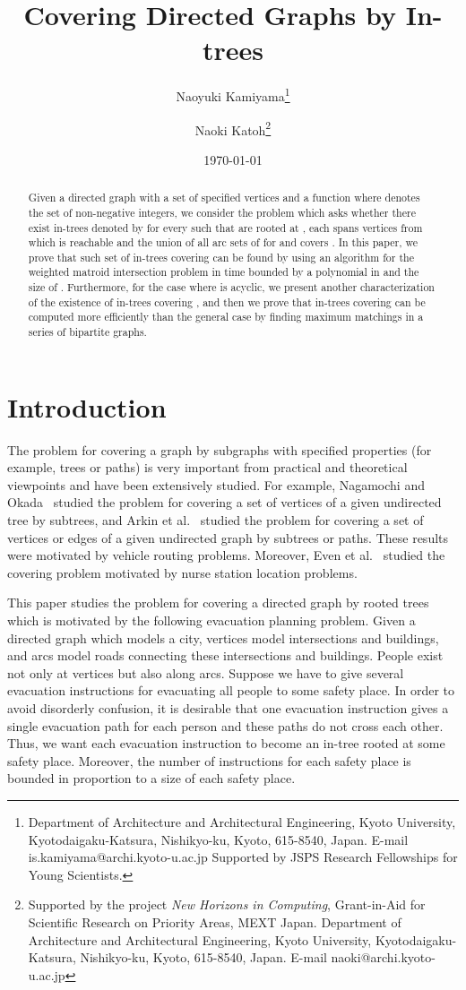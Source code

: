 \documentclass[11pt]{article}
\title{Covering Directed Graphs by In-trees}
\author{Naoyuki {\sc Kamiyama}\thanks{
Department of Architecture and Architectural Engineering,
Kyoto University, 
Kyotodaigaku-Katsura, Nishikyo-ku,
Kyoto, 615-8540, Japan.
E-mail {\ttfamily is.kamiyama@archi.kyoto-u.ac.jp} 
Supported by JSPS Research Fellowships for Young Scientists.}
\and 
Naoki {\sc Katoh}\thanks{Supported by the project {\it New Horizons in
Computing}, Grant-in-Aid for Scientific Research 
on Priority Areas, MEXT Japan.
Department of Architecture and Architectural Engineering,
Kyoto University, 
Kyotodaigaku-Katsura, Nishikyo-ku,
Kyoto, 615-8540, Japan.
E-mail {\ttfamily naoki@archi.kyoto-u.ac.jp} 
}
}
\date{\today}
\newcounter{ni}
\theoremstyle{plain}
\begin{document}
\maketitle

\begin{abstract}
\noindent
Given a directed graph  with a set of  specified vertices
 and a function  where  denotes the set of non-negative integers, 
we consider the problem which asks whether there exist  in-trees denoted by 
 for every  such that
 are rooted at , each 
spans vertices from which  is reachable and the union of all arc sets of
 for  and  covers . In this paper, we prove that such set of 
in-trees covering  can be found by using an algorithm for the weighted matroid intersection problem
in time bounded by a polynomial in  and the size of . 
Furthermore, for the case where  is acyclic, 
we present another characterization of the existence of in-trees covering ,  
and then we prove that in-trees covering  can be 
computed more efficiently than the general case by finding maximum matchings in a series of bipartite graphs.
\end{abstract}

\section{Introduction}


The problem for covering a graph by subgraphs with specified properties (for example, trees or paths) is
very important from practical and theoretical viewpoints and have
been extensively studied. For example, Nagamochi and Okada~\cite{NO07}
studied the problem for covering a set of vertices of a given undirected
tree by subtrees, and Arkin et al.~\cite{AHL06} studied the problem  
for covering a set of vertices or edges of a given undirected graph by
subtrees or paths. These results were motivated by vehicle routing problems. 
Moreover, Even et al.~\cite{EGKRS04} studied the covering problem
motivated by nurse station location problems. 

This paper studies the problem for covering a directed graph by rooted trees which is 
motivated by the following evacuation planning problem. 
Given a directed graph which models a city, 
vertices model intersections and buildings,
and arcs model roads connecting these intersections and buildings.
People exist not only at vertices but also along arcs. 
Suppose we have to give several evacuation instructions for
evacuating all people to some safety place. In order to avoid disorderly
confusion, it is desirable that one evacuation instruction gives a single evacuation path
for each person and these paths do not cross each other. 
Thus, we want each evacuation instruction to become an
in-tree rooted at some safety place. Moreover, the number of instructions
for each safety place is bounded in proportion to a size of each safety place. 
\end{document}

